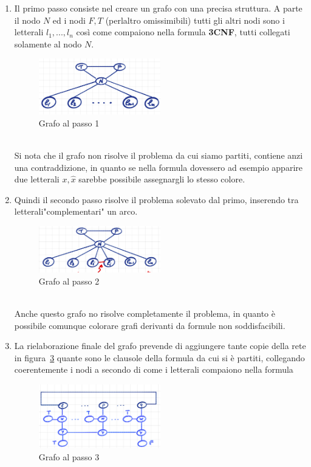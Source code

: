 \documentclass[a4paper]{article}
\begin{document}
\begin{enumerate}
	\item Il primo passo consiste nel creare un grafo con una precisa struttura.
		A parte il nodo $N$ ed i nodi $F,T$ (perlaltro omissimibili) tutti gli altri nodi sono i letterali $l_1,...,l_n$ così come compaiono nella formula \textbf{3CNF}, tutti collegati solamente al nodo $N$.
		\begin{figure}[!ht]
		\centering
		\includegraphics[width = 0.5\textwidth]{./img/E10_passo1.png}
		\caption{Grafo al passo 1} \label{FIG:E10_passo1}
		\end{figure}\\
		Si nota che il grafo non risolve il problema da cui siamo partiti, contiene anzi una contraddizione, in quanto se nella formula dovessero ad esempio apparire due letterali ${x,\hat x}$ sarebbe possibile assegnargli lo stesso colore.
	\item Quindi il secondo passo risolve il problema solevato dal primo, inserendo tra letterali"complementari" un arco.
		\begin{figure}[!ht]
		\centering
		\includegraphics[width = 0.5\textwidth]{./img/E10_passo2.png}
		\caption{Grafo al passo 2} \label{FIG:E10_passo2}
		\end{figure}\\
		Anche questo grafo no risolve completamente il problema, in quanto è possibile comunque colorare grafi derivanti da formule non soddisfacibili.
	\item La rielaborazione finale del grafo prevende di aggiungere tante copie della rete in figura~\ref{FIG:E10_passo3} quante sono le clausole della formula da cui si è partiti, collegando coerentemente i nodi a secondo di come i letterali compaiono nella formula
		\begin{figure}[!ht]
		\centering
		\includegraphics[width = 0.5\textwidth]{./img/E10_passo3.png}
		\caption{Grafo al passo 3} \label{FIG:E10_passo3}
		\end{figure}\\
\end{enumerate}
\end{document}
